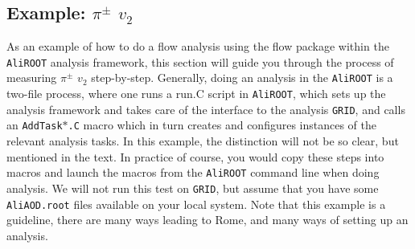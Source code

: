 \documentclass[a4paper]{book}
\numberwithin{equation}{subsection}
\begin{document}
\subsection{Example: $\pi^{\pm}$ $v_2$}\label{sec:example}
As an example of how to do a flow analysis using the flow package within the \texttt{AliROOT} analysis framework, this section will guide you through the process of measuring $\pi^{\pm}$ $v_2$ step-by-step. Generally, doing an analysis in the \texttt{AliROOT} is a two-file process, where one runs a run.C script in \texttt{AliROOT}, which sets up the analysis framework and takes care of the interface to the analysis \texttt{GRID}, and calls an \texttt{AddTask$\ast$.C} macro which in turn creates and configures instances of the relevant analysis tasks. In this example, the distinction will not be so clear, but mentioned in the text. In practice of course, you would copy these steps into macros and launch the macros from the \texttt{AliROOT} command line when doing analysis. We will not run this test on \texttt{GRID}, but assume that you have some \texttt{AliAOD.root} files available on your local system. Note that this example is a guideline, there are many ways leading to Rome, and many ways of setting up an analysis. 
\end{document}
